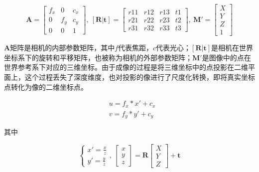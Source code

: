 \begin{equation}
  \mathbf{A} = \begin{bmatrix}
    f_x & 0   & c_x\\
    0   & f_y & c_y\\
    0   & 0   & 1
  \end{bmatrix},\ 
  [\mathbf{R}|\mathbf{t}] = \begin{bmatrix}
    r11 & r12 & r13 & t1\\
    r21 & r22 & r23 & t2\\
    r31 & r32 & r33 & t3
  \end{bmatrix},\ 
  \mathbf{M}' = \begin{bmatrix}
    X\\
    Y\\
    Z\\
    1
  \end{bmatrix}
\end{equation}

$\mathbf{A}$矩阵是相机的内部参数矩阵，其中$f$代表焦距，$c$代表光心；$[\mathbf{R}|\mathbf{t}]$是相机在世界坐标系下的旋转和平移矩阵，也被称为相机的外部参数矩阵；$\mathbf{M}'$是图像中的点在世界参考系下对应的三维坐标。由于成像的过程是将三维坐标中的点投影在二维平面上，这个过程丢失了深度维度，也对投影的像进行了尺度化转换，即将真实坐标点转化为像的二维坐标点。

\begin{equation}
  \label{cha2:eqa:xy2uv}
  \begin{aligned}
    &u = f_x * x' + c_x\\
    &v = f_y * y' + c_y
  \end{aligned}  
\end{equation}

其中

\begin{equation}
  \begin{cases}
    x' = \frac {x} {z}\\
    y' = \frac {y} {z}
  \end{cases},\ \begin{bmatrix}
    x\\
    y\\
    z
  \end{bmatrix} = \mathbf{R}\begin{bmatrix}
    X\\
    Y\\
    Z
  \end{bmatrix} + \mathbf{t}
\end{equation}

